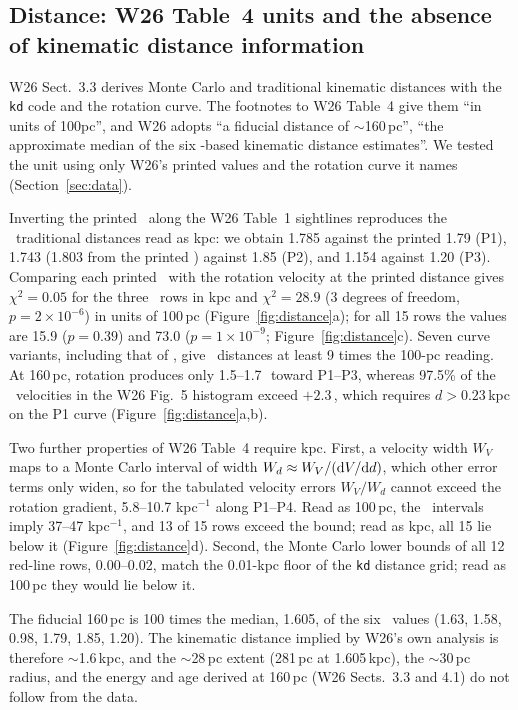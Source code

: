 \subsection{Distance: W26 Table~4 units and the absence of kinematic distance information}
\label{sec:distance}

W26 Sect.~3.3 derives Monte Carlo and traditional kinematic distances with the \texttt{kd} code \citep{Wenger2018} and the \citet{Reid2014} rotation curve. The footnotes to W26 Table~4 give them ``in units of 100pc'', and W26 adopts ``a fiducial distance of $\sim$160\,pc'', ``the approximate median of the six \Oiii-based kinematic distance estimates''. We tested the unit using only W26's printed values and the rotation curve it names (Section~\ref{sec:data}).

Inverting the printed \vlsr\ along the W26 Table~1 sightlines reproduces the \Oiii\ traditional distances read as kpc: we obtain 1.785 against the printed 1.79 (P1), 1.743 (1.803 from the printed \vhel) against 1.85 (P2), and 1.154 against 1.20 (P3). Comparing each printed \vlsr\ with the rotation velocity at the printed distance gives $\chi^2=0.05$ for the three \Oiii\ rows in kpc and $\chi^2=28.9$ (3 degrees of freedom, $p=2\times10^{-6}$) in units of 100\,pc (Figure~\ref{fig:distance}a); for all 15 rows the values are 15.9 ($p=0.39$) and 73.0 ($p=1\times10^{-9}$; Figure~\ref{fig:distance}c). Seven curve variants, including that of \citet{Reid2019}, give \Oiii\ distances at least 9 times the 100-pc reading. At 160\,pc, rotation produces only 1.5--1.7\,\kms\ toward P1--P3, whereas 97.5\% of the \Oiii\ velocities in the W26 Fig.~5 histogram exceed $+2.3$\,\kms, which requires $d>0.23$\,kpc on the P1 curve (Figure~\ref{fig:distance}a,b).

Two further properties of W26 Table~4 require kpc. First, a velocity width $W_V$ maps to a Monte Carlo interval of width $W_d\approx W_V/({\rm d}V/{\rm d}d)$, which other error terms only widen, so for the tabulated velocity errors $W_V/W_d$ cannot exceed the rotation gradient, 5.8--10.7\,\kms\,kpc$^{-1}$ along P1--P4. Read as 100\,pc, the \Oiii\ intervals imply 37--47\,\kms\,kpc$^{-1}$, and 13 of 15 rows exceed the bound; read as kpc, all 15 lie below it (Figure~\ref{fig:distance}d). Second, the Monte Carlo lower bounds of all 12 red-line rows, 0.00--0.02, match the 0.01-kpc floor of the \texttt{kd} distance grid; read as 100\,pc they would lie below it.

The fiducial 160\,pc is 100 times the median, 1.605, of the six \Oiii\ values (1.63, 1.58, 0.98, 1.79, 1.85, 1.20). The kinematic distance implied by W26's own analysis is therefore $\sim$1.6\,kpc, and the $\sim$28\,pc extent (281\,pc at 1.605\,kpc), the $\sim$30\,pc radius, and the energy and age derived at 160\,pc (W26 Sects.~3.3 and 4.1) do not follow from the data.

